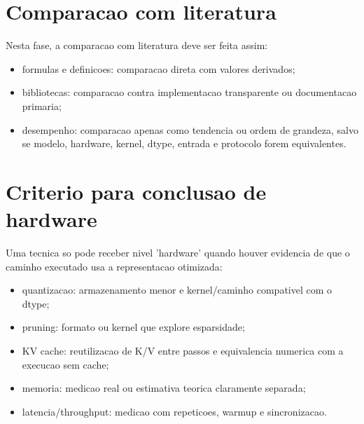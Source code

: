 \section{Comparacao com literatura}



Nesta fase, a comparacao com literatura deve ser feita assim:


\begin{itemize}
\item formulas e definicoes: comparacao direta com valores derivados;
\item bibliotecas: comparacao contra implementacao transparente ou documentacao
primaria;
\item desempenho: comparacao apenas como tendencia ou ordem de grandeza, salvo se
modelo, hardware, kernel, dtype, entrada e protocolo forem equivalentes.
\end{itemize}


\section{Criterio para conclusao de hardware}




Uma tecnica so pode receber nivel 'hardware' quando houver evidencia de que o caminho executado usa a representacao otimizada:


\begin{itemize}
\item quantizacao: armazenamento menor e kernel/caminho compativel com o dtype;
\item pruning: formato ou kernel que explore esparsidade;
\item KV cache: reutilizacao de K/V entre passos e equivalencia numerica com a
execucao sem cache;
\item memoria: medicao real ou estimativa teorica claramente separada;
\item latencia/throughput: medicao com repeticoes, warmup e sincronizacao.
\end{itemize}
